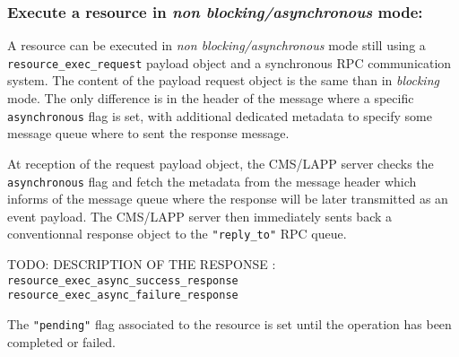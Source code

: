 \clearpage
\pagebreak
\subsubsection{Execute a resource in \emph{non blocking/asynchronous} mode:}

A resource  can be  executed in \emph{non  blocking/asynchronous} mode  still using
a \texttt{resource\_exec\_request} payload  object and a synchronous RPC
communication system.
The content of the payload request object is the same than in \emph{blocking} mode.
The only difference is in the header of the message where a specific
\texttt{asynchronous} flag is set, with additional dedicated metadata
to specify some message queue where to sent the response message.

At reception of the request payload object, the  CMS/LAPP server checks
the \texttt{asynchronous} flag and fetch the metadata from the message header
which informs of the message queue where the response will be later transmitted as an event
payload. The CMS/LAPP server then immediately sents back a conventionnal response object
to the \texttt{"reply\_to"} RPC queue.

TODO: DESCRIPTION OF THE RESPONSE :
\texttt{resource\_exec\_async\_success\_response}
\texttt{resource\_exec\_async\_failure\_response}

The \texttt{"pending"} flag associated to the resource
is set until the  operation has been completed or failed.





